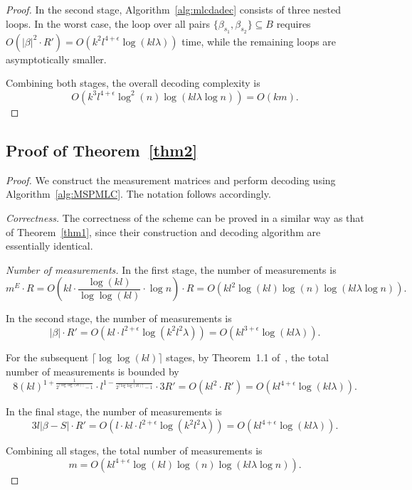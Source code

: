 \documentclass{article}
\begin{document}
\begin{proof}
In the second stage, Algorithm~\ref{alg:mlcdadec} consists of three nested loops. In the worst case, the loop over all pairs $\{\beta_{s_1}, \beta_{s_2}\} \subseteq B$ requires $O(|\beta|^2\cdot R') = O(k^2 l^{4+\epsilon}\log(kl\lambda))$ time, while the remaining loops are asymptotically smaller.

\medskip

Combining both stages, the overall decoding complexity is
\[
O\!\left(k^3 l^{4+\epsilon} \log^2 (n)\log(kl\lambda \log n)\right)=O(km).
\]
\end{proof}

\subsection{Proof of Theorem~\ref{thm2}}
\begin{proof}
    We construct the measurement matrices and perform decoding using Algorithm~\ref{alg:MSPMLC}. The notation follows accordingly.

\medskip

\emph{Correctness.}
The correctness of the scheme can be proved in a similar way as that of Theorem~\ref{thm1}, since their construction and decoding algorithm are essentially identical.

\medskip

\emph{Number of measurements.}
In the first stage, the number of measurements is
\[
m^E \cdot R
= O\!\left(kl \cdot \frac{\log(kl)}{\log\log(kl)} \cdot \log n\right) \cdot R
= O\!\left(kl^2 \log(kl)\log (n) \log(kl\lambda \log n)\right).
\]

In the second stage, the number of measurements is
\[
|\beta| \cdot R'
= O\!\left(kl \cdot l^{2+\epsilon} \log(k^2 l^2 \lambda)\right)
= O\!\left(kl^{3+\epsilon} \log(kl\lambda)\right).
\]

For the subsequent $\lceil \log\log(kl) \rceil$ stages, by Theorem~1.1 of~\cite{black2025learning}, the total number of measurements is bounded by
\[
8(kl)^{1+\frac{1}{2^{\lceil\log\log(kl)\rceil}-1}}
\cdot l^{1-\frac{1}{2^{\lceil\log\log(kl)\rceil}-1}}
\cdot 3R'
= O\!\left(kl^2 \cdot R'\right)
= O\!\left(kl^{4+\epsilon} \log(kl\lambda)\right).
\]

In the final stage, the number of measurements is
\[
3l|\beta - S| \cdot R'
= O\!\left(l \cdot kl \cdot l^{2+\epsilon} \log(k^2 l^2 \lambda)\right)
= O\!\left(kl^{4+\epsilon} \log(kl\lambda)\right).
\]

\medskip

Combining all stages, the total number of measurements is
\[
m = O\!\left(kl^{4+\epsilon} \log(kl)\log (n) \log(kl\lambda \log n)\right).
\]


\end{proof}
\end{document}
